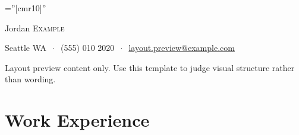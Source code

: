 \documentclass[letterpaper,10pt]{article} %
\begin{document}
\pagestyle{empty} %

\font\fb=''[cmr10]'' %

\begin{center}
{\Huge Jordan \textsc{Example}\bigskip }%

\vspace{-5mm}
Seattle WA  $\ \cdot \ $
 (555) 010 2020 $\ \cdot \ $
\href{mailto:layout.preview@example.com}{layout.preview@example.com}


\vspace{-5mm}
 \singlespacing
 \vspace{-1mm}

Layout preview content only. Use this template to judge visual structure rather than wording.

\end{center}





\section{Work Experience}
\end{document}
